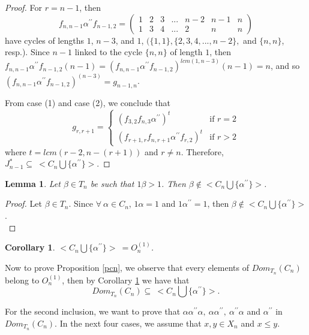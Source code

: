 \documentclass[10pt]{extarticle}
\numberwithin{equation}{section}
\numberwithin{bbb}{section}
\newtheorem{lemma}{Lemma}[section]
\newtheorem{corollary}{Corollary}[section]
\numberwithin{equation}{section}
\begin{document}
\begin{proof}
\vspace{0.2cm}
For $r=n-1$, then
$$f_{n,n-1} \alpha^{\prime\prime}f_{n-1,2}=
\begin{pmatrix}  
1&2&3&...&n-2&n-1&n\\1&3&4&...&2&n&n
\end{pmatrix}$$
have cycles of lengths $1$, $n-3$, and $1$,  $( \{1,1\}, \{2,3,4,...,n-2\},$ and $\{n,n\}$, resp.). Since $n-1$ linked to the cycle $\{n,n\}$ of length $1$, then $f_{n,n-1} \alpha^{\prime\prime}f_{n-1,2}(n-1)=(f_{n,n-1} \alpha^{\prime\prime}f_{n-1,2})^{lcm(1,n-3)}(n-1)=n$, and so $(f_{n,n-1} \alpha^{\prime\prime}f_{n-1,2})^{(n-3)}=g_{n-1,n}$.

From case (1) and case (2), we conclude that 
\begin{equation*}
    g_{r,r+1}= \begin{cases}
     (f_{3,2}f_{n,3}\alpha^{\prime\prime})^{t} & \text{if } r=2\\
    (f_{r+1,r}f_{n,r+1}\alpha^{\prime\prime}f_{r,2})^{t} & \text{if } r>2
    \end{cases}
\end{equation*}
where $t=lcm(r-2,n-(r+1))$ and $r \neq n$. Therefore, $J^*_{n-1}\subseteq \ <C_n \bigcup \{\alpha^{\prime\prime}\}>$.
\end{proof}

\begin{lemma}
  Let $\beta \in T_n$ be such that $1\beta>1$. Then $\beta \notin <C_n \bigcup \{{\alpha^{\prime\prime}}\}>$.
\end{lemma}
\begin{proof}
   Let $\beta \in T_n$. Since $\forall \ \alpha\in C_n$, $1\alpha=1$ and $1\alpha^{\prime\prime}=1$, then $\beta \notin <C_n \bigcup \{{\alpha^{\prime\prime}}\}>$.\\
\end{proof}

\begin{corollary}\label{ccn}
  $<C_n \bigcup \{{\alpha^{\prime\prime}}\}> \ =O_{n}^{(1)}$.  
\end{corollary}

\vspace{0.5cm}
Now to prove Proposition \ref{pcn}, we observe that every elements of $Dom_{T_n}(C_n)$ belong to $O_{n}^{(1)}$, then by Corollary \ref{ccn} we have that 
$$Dom_{T_n}(C_n) \subseteq \ <C_n \bigcup \{{\alpha^{\prime\prime}}\}>.$$

\vspace{0.5cm}
For the second inclusion, we want to prove that $\alpha\alpha^{\prime\prime}\alpha, \ \alpha\alpha^{\prime\prime},\ \alpha^{\prime\prime}\alpha$ and $\alpha^{\prime\prime}$ in $Dom_{T_n}(C_n)$. 
In the next four cases, we assume that $x,y \in X_n$ and $x\leq y$.
\end{document}
